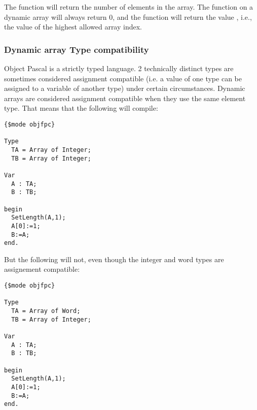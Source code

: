 The  function will return the number of elements in the array.
The  function on a dynamic array will always return 0, and the
 function will return the value , i.e., the value of the
highest allowed array index. 

\subsubsection{Dynamic array Type compatibility}
Object Pascal is a strictly typed language. 2 technically distinct types are sometimes considered assignment compatible
(i.e. a value of one type can be assigned to a variable of another type) under certain circumstances. 
Dynamic arrays are considered assignment compatible when they use the same element type. 
That means that the following will compile:
\begin{verbatim}
{$mode objfpc}

Type
  TA = Array of Integer;
  TB = Array of Integer;

Var
  A : TA;
  B : TB;

begin
  SetLength(A,1);
  A[0]:=1;
  B:=A;
end.
\end{verbatim}
But the following will not, even though the integer and word types are assignement compatible:
\begin{verbatim}
{$mode objfpc}

Type
  TA = Array of Word;
  TB = Array of Integer;

Var
  A : TA;
  B : TB;

begin
  SetLength(A,1);
  A[0]:=1;
  B:=A;
end.
\end{verbatim}

